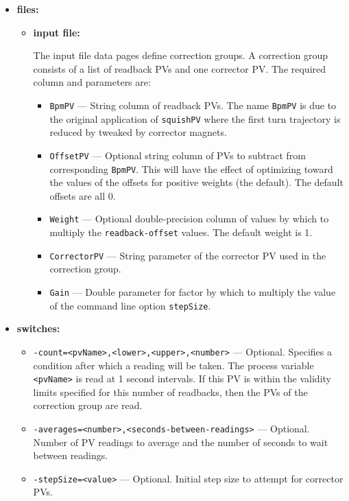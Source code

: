 \begin{itemize}
\item {\bf files:}
\begin{itemize}
\item {\bf input file:}\par
The input file data pages define correction groups. A correction group
consists of a list of readback PVs and one corrector PV. The required column and parameters are:
\begin{itemize}
        \item {\tt BpmPV} --- String column of readback PVs. The name \verb+BpmPV+ is due
                to the original application of \verb+squishPV+ where the first turn
                trajectory is reduced by tweaked by corrector magnets.
        \item {\tt OffsetPV} --- Optional string column of PVs to subtract from corresponding \verb+BpmPV+.
                This will have the effect of optimizing toward the values of the offsets for
                positive weights (the default).  The default offsets are all 0.
        \item {\tt Weight} --- Optional double-precision column of values by which to multiply the
                \verb+readback-offset+ values.  The default weight is 1.
        \item {\tt CorrectorPV} --- String parameter of the corrector PV used in the correction group.
        \item {\tt Gain} --- Double parameter for factor by which to multiply the
                value of the command line option \verb+stepSize+.
\end{itemize}
\end{itemize}
%
\item {\bf switches:}
%
%
    \begin{itemize}
      \item {\tt -count=<pvName>,<lower>,<upper>,<number>} --- Optional. Specifies
                a condition after which a reading will be taken. The process variable
                \verb+<pvName>+ is read at 1 second intervals. If this
                PV is within the validity limits specified for this number of readbacks, then
                the PVs of the correction group are read.                
        \item {\tt -averages=<number>,<seconds-between-readings>} --- Optional. Number of PV readings to average
                and the number of seconds to wait between readings.
        \item {\tt -stepSize=<value>} --- Optional. Initial step size to attempt for corrector PVs.

\end{itemize}
\end{itemize}
